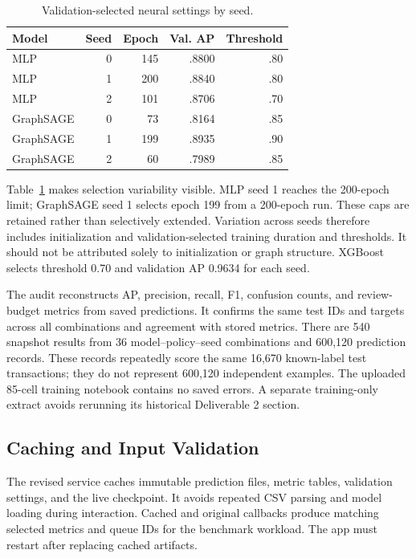\documentclass[10pt,twocolumn,letterpaper]{article}
\begin{document}
\begin{table}[t]\caption{Validation-selected neural settings by seed.}\centering\small
\begin{tabular}{lrrrr}\toprule
Model & Seed & Epoch & Val. AP & Threshold\\\midrule
MLP & 0 & 145 & .8800 & .80\\
MLP & 1 & 200 & .8840 & .80\\
MLP & 2 & 101 & .8706 & .70\\
GraphSAGE & 0 & 73 & .8164 & .85\\
GraphSAGE & 1 & 199 & .8935 & .90\\
GraphSAGE & 2 & 60 & .7989 & .85\\\bottomrule
\end{tabular}\label{tab:settings}\end{table}

Table~\ref{tab:settings} makes selection variability visible. MLP seed 1 reaches the 200-epoch limit; GraphSAGE seed 1 selects epoch 199 from a 200-epoch run. These caps are retained rather than selectively extended. Variation across seeds therefore includes initialization and validation-selected training duration and thresholds. It should not be attributed solely to initialization or graph structure. XGBoost selects threshold 0.70 and validation AP 0.9634 for each seed.

The audit reconstructs AP, precision, recall, F1, confusion counts, and review-budget metrics from saved predictions. It confirms the same test IDs and targets across all combinations and agreement with stored metrics. There are 540 snapshot results from 36 model--policy--seed combinations and 600,120 prediction records. These records repeatedly score the same 16,670 known-label test transactions; they do not represent 600,120 independent examples. The uploaded 85-cell training notebook contains no saved errors. A separate training-only extract avoids rerunning its historical Deliverable 2 section.

\subsection{Caching and Input Validation}
The revised service caches immutable prediction files, metric tables, validation settings, and the live checkpoint. It avoids repeated CSV parsing and model loading during interaction. Cached and original callbacks produce matching selected metrics and queue IDs for the benchmark workload. The app must restart after replacing cached artifacts.
\end{document}
